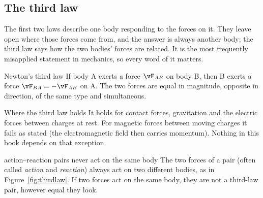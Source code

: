 
\subsection{The third law}

The first two laws describe one body responding to the forces on it. They leave open where those forces
come from, and the answer is always another body; the third law says how the two bodies' forces are
related. It is the most frequently misapplied statement in mechanics, so every word of it matters.

\begin{keybox}{Newton's third law}
If body A exerts a force $\vF_{AB}$ on body B, then B exerts a force $\vF_{BA}=-\vF_{AB}$ on A. The two
forces are equal in magnitude, opposite in direction, of the same type and simultaneous.
\end{keybox}

\begin{remarkbox}{Where the third law holds}
It holds for contact forces, gravitation and the electric forces between charges at rest. For magnetic
forces between moving charges it fails as stated (the electromagnetic field then carries momentum).
Nothing in this book depends on that exception.
\end{remarkbox}

\begin{figure}[htbp]
\centering
{}
\end{figure}

\begin{trapbox}{action--reaction pairs never act on the same body}
The two forces of a pair (often called \emph{action} and \emph{reaction}) always act on two different
bodies, as in Figure~\ref{fig:thirdlaw}. If two forces act on the same body, they are not a third-law
pair, however equal they look.
\end{trapbox}

